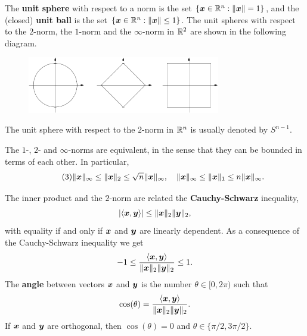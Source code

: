 \documentclass[11pt,a4paper]{memoir}
\begin{document}
The \textbf{unit sphere} with respect to a norm is the set $\{\bm{x}\in \mathbb{R}^n \mathrel{\mathop{:}} \Vert {\bm{x}}\Vert=1\}$, and the (closed) \textbf{unit ball} is the set $\{\bm{x}\in \mathbb{R}^n \mathrel{\mathop{:}} \Vert {\bm{x}}\Vert\leq 1\}$. The unit spheres with respect to the $2$-norm, the $1$-norm and the $\infty$-norm in $\mathbb{R}^2$ are shown in the following diagram.
\begin{center}
\begin{figure}[h]
\centering
\includegraphics[width=0.75\textwidth]{images/norms.pdf}
\end{figure}
\end{center}
The unit sphere with respect to the $2$-norm in $\mathbb{R}^n$ is usually denoted by $S^{n-1}$.

The $1$-, $2$- and $\infty$-norms are equivalent, in the sense that they can be bounded in terms of each other. In particular,
\begin{equation}\label{eq:normineq}\tag{3}
 \Vert {\bm{x}}\Vert_\infty \leq \Vert {\bm{x}}\Vert_2\leq \sqrt{n}\Vert {\bm{x}}\Vert_\infty, \quad \Vert {\bm{x}}\Vert_\infty \leq \Vert {\bm{x}}\Vert_1\leq n\Vert {\bm{x}}\Vert_\infty.
\end{equation}

The inner product and the $2$-norm are related the \textbf{Cauchy-Schwarz} inequality,
\begin{equation*}
 |\langle {\bm{x}}, {\bm{y}} \rangle| \leq \Vert {\bm{x}}\Vert_2\Vert {\bm{y}}\Vert_2,
\end{equation*}
with equality if and only if $\bm{x}$ and $\bm{y}$ are linearly dependent. As a consequence of the Cauchy-Schwarz inequality we get
\begin{equation*}
 -1\leq \frac{\langle {\bm{x}}, {\bm{y}} \rangle}{\Vert {\bm{x}}\Vert_2\Vert {\bm{y}}\Vert_2}\leq 1.
\end{equation*}
The \strictpagecheck{}\textbf{angle} between vectors $\bm{x}$ and $\bm{y}$ is the number $\theta\in [0,2\pi)$ such that
\begin{equation*}
 \cos(\theta) = \frac{\langle {\bm{x}}, {\bm{y}} \rangle}{\Vert {\bm{x}}\Vert_2\Vert {\bm{y}}\Vert_2}.
\end{equation*}
If $\bm{x}$ and $\bm{y}$ are orthogonal, then $\cos(\theta)=0$ and $\theta\in \{\pi/2,3\pi/2\}$.
\end{document}
